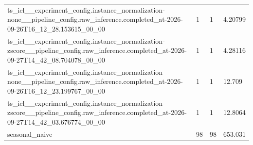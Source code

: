 \begin{tabular}{llll}
ts\_icl\_\_experiment\_config.instance\_normalization-none\_\_pipeline\_config.raw\_inference.completed\_at-2026-09-26T16\_12\_28.153615\_00\_00 & 1 & 1 & 4.20799 \\
ts\_icl\_\_experiment\_config.instance\_normalization-zscore\_\_pipeline\_config.raw\_inference.completed\_at-2026-09-27T14\_42\_08.704078\_00\_00 & 1 & 1 & 4.28116 \\
ts\_icl\_\_experiment\_config.instance\_normalization-none\_\_pipeline\_config.raw\_inference.completed\_at-2026-09-26T16\_12\_23.199767\_00\_00 & 1 & 1 & 12.709 \\
ts\_icl\_\_experiment\_config.instance\_normalization-zscore\_\_pipeline\_config.raw\_inference.completed\_at-2026-09-27T14\_42\_03.676774\_00\_00 & 1 & 1 & 12.8064 \\
seasonal\_naive & 98 & 98 & 653.031 \\
\bottomrule
\end{tabular}
